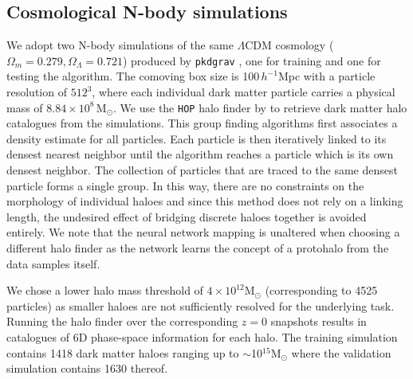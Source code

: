 \documentclass[fleqn,usenatbib]{mnras}
\newcommand{\Msun}{\text{M}_{\odot}}	%
\begin{document}
\subsection{Cosmological N-body simulations}
We adopt two N-body simulations of the same $\Lambda$CDM cosmology ($\Omega_{m}=0.279, \Omega_{\Lambda}=0.721$) produced by \texttt{pkdgrav} \citep{pkdgrav2000}, one for training and one for testing the algorithm. The comoving box size is 100$\,h^{-1}$Mpc with a particle resolution of $512^{3}$, where each individual dark matter particle carries a physical mass of $8.84 \times 10^{8}\,\Msun$.
We use the \texttt{HOP} halo finder by \cite{Eisenstein1998} to retrieve dark matter halo catalogues from the simulations. This group finding algorithms first associates a density estimate for all particles. Each particle is then iteratively linked to its densest nearest neighbor until the algorithm reaches a particle which is its own densest neighbor. The collection of particles that are traced to the same densest particle forms a single group.
In this way, there are no constraints on the morphology of individual haloes and since this method does not rely on a linking length, the undesired effect of bridging discrete haloes together is avoided entirely. We note that the neural network mapping is unaltered when choosing a different halo finder as the network learns the concept of a protohalo from the data samples itself.\par
We chose a lower halo mass threshold of $4\times 10^{12}\Msun$ (corresponding to 4525 particles) as smaller haloes are not sufficiently resolved for the underlying task. Running the halo finder over the corresponding $z=0$ snapshots results in catalogues of 6D phase-space information for each halo. The training simulation contains 1418 dark matter haloes ranging up to $\sim$10$^{15}\Msun$ where the validation simulation contains 1630 thereof.
\end{document}
